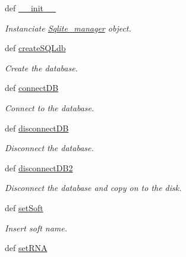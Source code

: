 \begin{DoxyCompactItemize}
\item 
def \hyperlink{classirna_1_1David2tulip_1_1Sqlite__manager_1_1Sqlite__manager_a95c1efe26612c1a11d385101c99fe518}{\-\_\-\-\_\-init\-\_\-\-\_\-}
\begin{DoxyCompactList}\small\item\em \-Instanciate \hyperlink{classirna_1_1David2tulip_1_1Sqlite__manager_1_1Sqlite__manager}{\-Sqlite\-\_\-manager} object. \end{DoxyCompactList}\item 
def \hyperlink{classirna_1_1David2tulip_1_1Sqlite__manager_1_1Sqlite__manager_a49ac8dbf721a77e28da3697c91811f86}{create\-S\-Q\-Ldb}
\begin{DoxyCompactList}\small\item\em \-Create the database. \end{DoxyCompactList}\item 
def \hyperlink{classirna_1_1David2tulip_1_1Sqlite__manager_1_1Sqlite__manager_afc8d92e7d727db2f4dbbeab90eba1851}{connect\-D\-B}
\begin{DoxyCompactList}\small\item\em \-Connect to the database. \end{DoxyCompactList}\item 
def \hyperlink{classirna_1_1David2tulip_1_1Sqlite__manager_1_1Sqlite__manager_a5b0e57390ce2342bb05af8748c79a891}{disconnect\-D\-B}
\begin{DoxyCompactList}\small\item\em \-Disconnect the database. \end{DoxyCompactList}\item 
def \hyperlink{classirna_1_1David2tulip_1_1Sqlite__manager_1_1Sqlite__manager_af52f0984a392d2032ec678d3489a07af}{disconnect\-D\-B2}
\begin{DoxyCompactList}\small\item\em \-Disconnect the database and copy on to the disk. \end{DoxyCompactList}\item 
def \hyperlink{classirna_1_1David2tulip_1_1Sqlite__manager_1_1Sqlite__manager_a8cbc5040e234b461584dcb5fa8e8e4b1}{set\-Soft}
\begin{DoxyCompactList}\small\item\em \-Insert soft name. \end{DoxyCompactList}\item 
def \hyperlink{classirna_1_1David2tulip_1_1Sqlite__manager_1_1Sqlite__manager_a41270a300017afebaeaae415ddaad339}{set\-R\-N\-A}

\end{DoxyCompactItemize}

